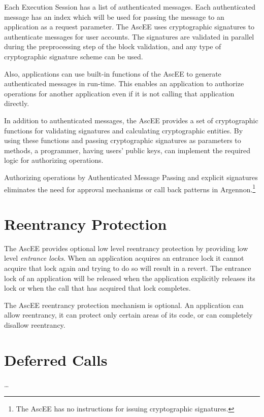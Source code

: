 Each Execution Session has a list of authenticated messages. Each authenticated message has an index which will be
used for passing the message to an application as a request parameter. The AscEE uses cryptographic signatures to
authenticate messages for user accounts. The signatures are validated in parallel during the
preprocessing step of the block validation, and any type of cryptographic signature scheme can be used.

Also, applications can use built-in functions of the AscEE to generate authenticated messages in run-time.
This enables an application to authorize operations for another application even if it is not calling that
application directly.

In addition to authenticated messages, the AscEE provides a set of
cryptographic functions for validating signatures and calculating cryptographic entities. By using these functions and
passing cryptographic signatures as parameters to methods, a programmer, having users' public keys, can implement
the required logic for authorizing operations.

Authorizing operations by Authenticated Message Passing and explicit signatures eliminates the need for approval
mechanisms or call back patterns in Argennon.\footnote{The AscEE has no instructions for issuing cryptographic
signatures.}


\section{Reentrancy Protection}\label{sec:reentrancy}

The AscEE provides optional low level reentrancy protection by providing low
level \emph{entrance locks}. When an application acquires an entrance lock it cannot acquire that lock again and trying
to do so will result in a revert. The entrance lock of an application will be released when the application explicitly
releases its lock or when the call that has acquired that lock completes.

The AscEE reentrancy protection mechanism is optional. An application can allow reentrancy, it can protect only certain
areas of its code, or can completely disallow reentrancy.


\section{Deferred Calls}\label{sec:deferred-calls}

\ldots



